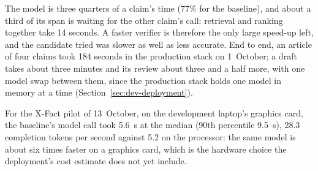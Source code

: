 The model is three quarters of a claim's time (77\% for the baseline),
and about a third of its span is waiting for the other claim's call:
retrieval and ranking together take 14 seconds. A faster verifier is
therefore the only large speed-up left, and the candidate tried was
slower as well as less accurate. End to end, an article of four claims
took 184 seconds in the production stack on 1~October; a draft takes
about three minutes and its review about three and a half more, with
one model swap between them, since the production stack holds one model
in memory at a time (Section~\ref{sec:dev-deployment}).

For the X-Fact pilot of 13~October, on the development laptop's
graphics card, the baseline's model call took 5.6~s at the median
(90th percentile 9.5~s), 28.3 completion tokens per second against 5.2
on the processor: the same model is about six times faster on a
graphics card, which is the hardware choice the deployment's cost
estimate does not yet include.
